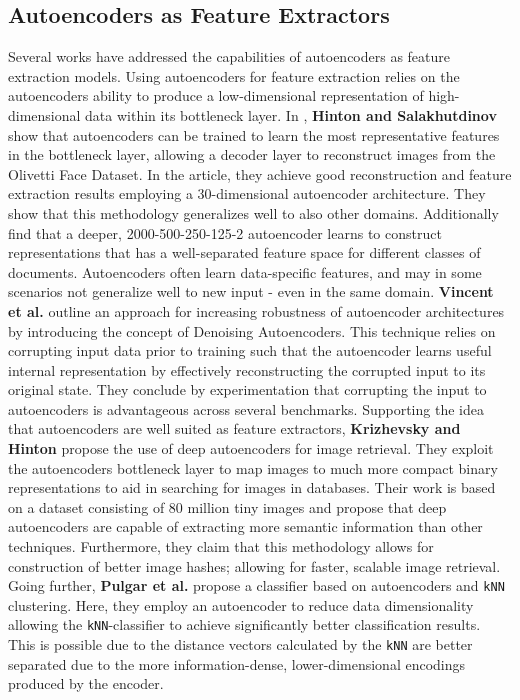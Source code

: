 \subsection{Autoencoders as Feature Extractors}
Several works have addressed the capabilities of autoencoders as feature extraction models. 
Using autoencoders for feature extraction relies on the autoencoders ability to produce a low-dimensional representation of high-dimensional data within its bottleneck layer.
\newline
In \autocite{HintonScience2006}, \textbf{Hinton and Salakhutdinov} show that autoencoders can be trained to learn the most representative features in the bottleneck layer, allowing a decoder layer to reconstruct images from the Olivetti Face Dataset.
In the article, they achieve good reconstruction and feature extraction results employing a 30-dimensional autoencoder architecture. 
They show that this methodology generalizes well to also other domains. Additionally find that a deeper, 2000-500-250-125-2 autoencoder learns to construct representations that has a well-separated feature space for different classes of documents.
\newline
Autoencoders often learn data-specific features, and may in some scenarios not generalize well to new input - even in the same domain. 
\textbf{Vincent et al.}\autocite{Vincent2008} outline an approach for increasing robustness of autoencoder architectures by introducing the concept of Denoising Autoencoders.
This technique relies on corrupting input data prior to training such that the autoencoder learns useful internal representation by effectively reconstructing the corrupted input to its original state. 
They conclude by experimentation that corrupting the input to autoencoders is advantageous across several benchmarks. 
\newline
Supporting the idea that autoencoders are well suited as feature extractors, \textbf{Krizhevsky and Hinton}\autocite{Krizhevsky2010} propose the use of deep autoencoders for image retrieval. 
They exploit the autoencoders bottleneck layer to map images to much more compact binary representations to aid in searching for images in databases. 
Their work is based on a dataset consisting of 80 million tiny images and propose that deep autoencoders are capable of extracting more semantic information than other techniques.
Furthermore, they claim that this methodology allows for construction of better image hashes; allowing for faster, scalable image retrieval.
\newline
Going further, \textbf{Pulgar et al.}\autocite{Pulgar2018} propose a classifier based on autoencoders and \texttt{kNN} clustering. 
Here, they employ an autoencoder to reduce data dimensionality allowing the \texttt{kNN}-classifier to achieve significantly better classification results. 
This is possible due to the distance vectors calculated by the \texttt{kNN} are better separated due to the more information-dense, lower-dimensional encodings produced by the encoder.


